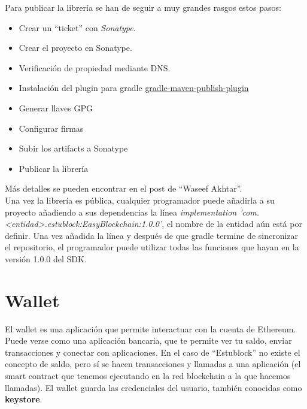 Para publicar la librería se han de seguir a muy grandes rasgos estos pasos:
\begin{itemize}
\item Crear un ``ticket'' con \emph{Sonatype}\cite{sonatype}.
\item Crear el proyecto en Sonatype.
\item Verificación de propiedad mediante DNS.
\item Instalación del plugin para gradle \href{https://github.com/vanniktech/gradle-maven-publish-plugin}{gradle-maven-publish-plugin}
\item Generar llaves GPG
\item Configurar firmas
\item Subir los artifacts a Sonatype
\item Publicar la librería
\end{itemize}

Más detalles se pueden encontrar en el post de ``Waseef Akhtar''\cite{waseef}. \\

Una vez la librería es pública, cualquier programador puede añadirla a su proyecto añadiendo a sus dependencias la línea \textit{implementation 'com.<entidad>.estublock:EasyBlockchain:1.0.0'}, el nombre de la entidad aún está por definir. Una vez añadida la línea y después de que gradle termine de sincronizar el repositorio, el programador puede utilizar todas las funciones que hayan en la versión 1.0.0 del SDK.


\section{Wallet} \label{sec:wallet}

El wallet es una aplicación que permite interactuar con la cuenta de Ethereum. Puede verse como una aplicación bancaria, que te permite ver tu saldo, enviar transacciones y conectar con aplicaciones. En el caso de ``Estublock'' no existe el concepto de saldo, pero sí se hacen transacciones y llamadas a una aplicación (el smart contract que tenemos ejecutando en la red blockchain a la que hacemos llamadas). El wallet guarda las credenciales del usuario, también conocidas como \textbf{keystore}. \\

